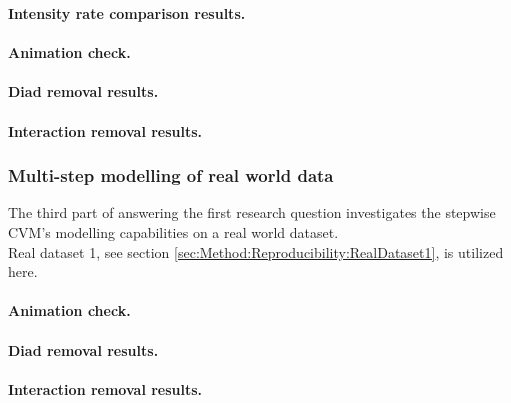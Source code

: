 \noindent \textbf{Intensity rate comparison results.}
\\\\
\textbf{Animation check.}
\\\\
\textbf{Diad removal results.}
\\\\
\textbf{Interaction removal results.}



\subsubsection{Multi-step modelling of real world data}
\label{sec:ResearchQuestion1:dataset2}
The third part of answering the first research question investigates the stepwise CVM's modelling capabilities on a real world dataset.
\\
Real dataset 1, see section \ref{sec:Method:Reproducibility:RealDataset1}, is utilized here.
\\\\
\textbf{Animation check.}
\\\\
\textbf{Diad removal results.}
\\\\
\textbf{Interaction removal results.}



